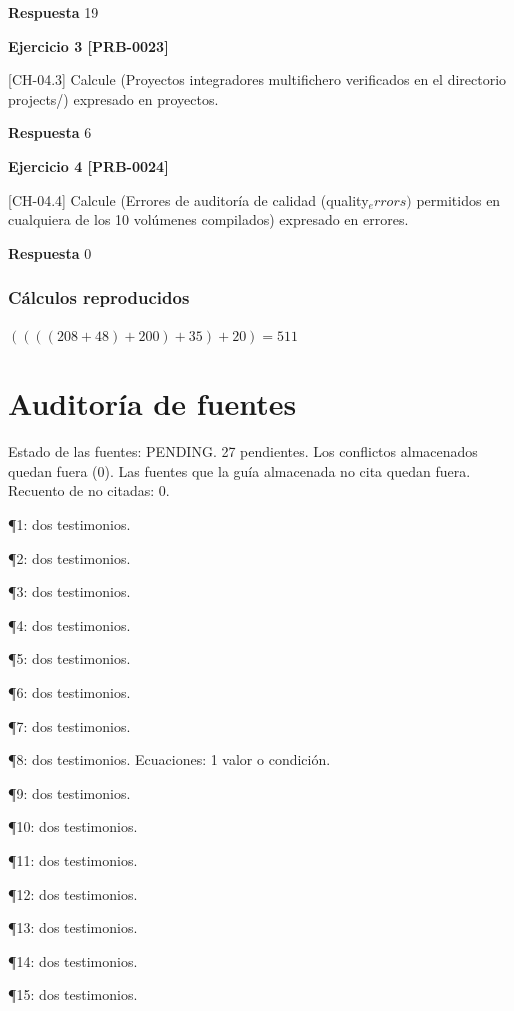 \documentclass{book}
\begin{document}
\noindent\textbf{Respuesta} 19

\noindent\textbf{Ejercicio 3 [PRB-0023]}

[CH-04.3] Calcule (Proyectos integradores multifichero verificados en el directorio projects/) expresado en proyectos.

\noindent\textbf{Respuesta} 6

\noindent\textbf{Ejercicio 4 [PRB-0024]}

[CH-04.4] Calcule (Errores de auditoría de calidad (quality\(_errors)\) permitidos en cualquiera de los 10 volúmenes compilados) expresado en errores.

\noindent\textbf{Respuesta} 0

\subsection*{Cálculos reproducidos}

\(\left(\left(\left(\left(208+48\right)+200\right)+35\right)+20\right) = 511\)
\chapter{Auditoría de fuentes}

\noindent Estado de las fuentes: PENDING. 27 pendientes. Los conflictos almacenados quedan fuera (0). Las fuentes que la guía almacenada no cita quedan fuera. Recuento de no citadas: 0.

\noindent ¶1: dos testimonios.

\noindent ¶2: dos testimonios.

\noindent ¶3: dos testimonios.

\noindent ¶4: dos testimonios.

\noindent ¶5: dos testimonios.

\noindent ¶6: dos testimonios.

\noindent ¶7: dos testimonios.

\noindent ¶8: dos testimonios. Ecuaciones: 1 valor o condición.

\noindent ¶9: dos testimonios.

\noindent ¶10: dos testimonios.

\noindent ¶11: dos testimonios.

\noindent ¶12: dos testimonios.

\noindent ¶13: dos testimonios.

\noindent ¶14: dos testimonios.

\noindent ¶15: dos testimonios.
\end{document}
